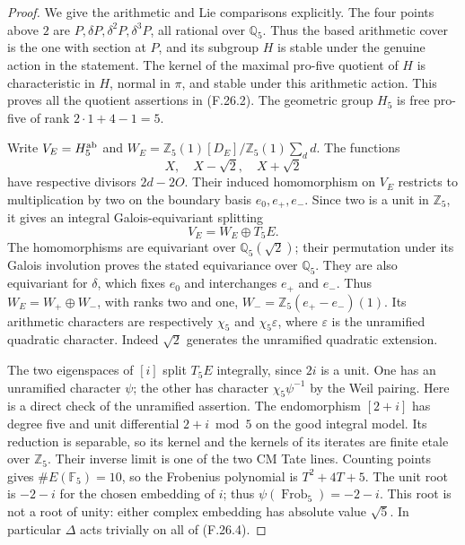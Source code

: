 \begin{proof}
We give the arithmetic and Lie comparisons explicitly.
The four points above $2$ are $P,\delta P,\delta^2P,\delta^3P$,
all rational over $\mathbb Q_5$. Thus the based arithmetic cover
is the one with section at $P$, and its subgroup $H$ is stable
under the genuine action in the statement. The kernel of the
maximal pro-five quotient of $H$ is characteristic in $H$,
normal in $\pi$, and stable under this arithmetic action.
This proves all the quotient assertions in (F.26.2).
The geometric group $H_5$ is free pro-five of rank
$2\cdot1+4-1=5$.

Write $V_E=H_5^{\rm ab}$ and
$W_E=\mathbb Z_5(1)[D_E]/\mathbb Z_5(1)\sum_d d$.
The functions
\[
             X,\quad X-\sqrt2,\quad X+\sqrt2
\]
have respective divisors $2d-2O$.
Their induced homomorphism on $V_E$ restricts to multiplication
by two on the boundary basis
$e_0,e_+,e_-$. Since two is a unit in $\mathbb Z_5$, it gives
an integral Galois-equivariant splitting
\[
                 V_E=W_E\oplus T_5E.                       \tag{F.26.4}
\]
The homomorphisms are equivariant over $\mathbb Q_5(\sqrt2)$;
their permutation under its Galois involution proves the stated
equivariance over $\mathbb Q_5$. They are also equivariant for
$\delta$, which fixes $e_0$ and interchanges $e_+$ and $e_-$.
Thus $W_E=W_+\oplus W_-$, with ranks two and one,
$W_-=\mathbb Z_5(e_+-e_-)(1)$.
Its arithmetic characters are respectively $\chi_5$ and
$\chi_5\varepsilon$, where $\varepsilon$ is the unramified
quadratic character. Indeed $\sqrt2$ generates the unramified
quadratic extension.

The two eigenspaces of $[i]$ split $T_5E$ integrally, since
$2i$ is a unit. One has an unramified character $\psi$;
the other has character $\chi_5\psi^{-1}$ by the Weil pairing.
Here is a direct check of the unramified assertion. The
endomorphism $[2+i]$ has degree five and unit differential
$2+i\bmod5$ on the good integral model. Its reduction is
separable, so its kernel and the kernels of its iterates are
finite etale over $\mathbb Z_5$. Their inverse limit is one
of the two CM Tate lines. Counting points gives
$\#E(\mathbb F_5)=10$, so the Frobenius polynomial is
$T^2+4T+5$. The unit root is $-2-i$ for the chosen embedding
of $i$; thus $\psi(\operatorname{Frob}_5)=-2-i$.
This root is not a root of unity: either complex embedding
has absolute value $\sqrt5$.
In particular $\Delta$ acts trivially on all of (F.26.4).


\end{proof}
